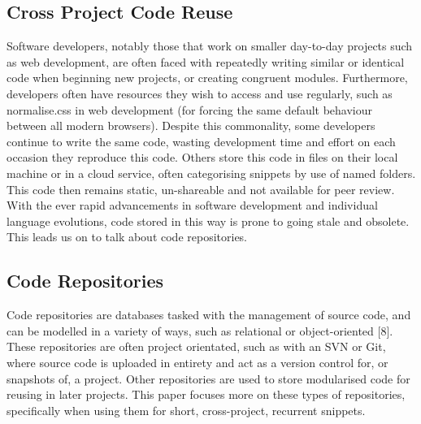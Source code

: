 \documentclass[11pt,openright,a4paper]{report}
\begin{document}
\subsection{Cross Project Code Reuse}
Software developers, notably those that work on smaller day-to-day projects such as web development, are often faced with repeatedly writing similar or identical code when beginning new projects, or creating congruent modules. Furthermore, developers often have resources they wish to access and use regularly, such as normalise.css in web development (for forcing the same default behaviour between all modern browsers).
Despite this commonality, some developers continue to write the same code, wasting development time and effort on each occasion they reproduce this code. 
Others store this code in files on their local machine or in a cloud service, often categorising snippets by use of named folders. This code then remains static, un-shareable and not available for peer review. 
With the ever rapid advancements in software development and individual language evolutions, code stored in this way is prone to going stale and obsolete. This leads us on to talk about code repositories.

\subsection{Code Repositories}
Code repositories are databases tasked with the management of source code, and can be modelled in a variety of ways, such as relational or object-oriented [8].
These repositories are often project orientated, such as with an SVN or Git, where source code is uploaded in entirety and act as a version control for, or snapshots of, a project.
Other repositories are used to store modularised code for reusing in later projects. This paper focuses more on these types of repositories, specifically when using them for short, cross-project, recurrent snippets.
\end{document}
